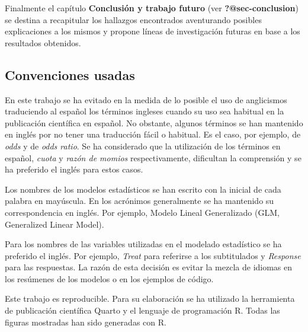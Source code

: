 \documentclass[
  letterpaper,
  DIV=11,
  numbers=noendperiod]{scrartcl}
\begin{document}
Finalmente el capítulo \textbf{Conclusión y trabajo futuro} (ver
\textbf{?@sec-conclusion}) se destina a recapitular los hallazgos
encontrados aventurando posibles explicaciones a los mismos y propone
líneas de investigación futuras en base a los resultados obtenidos.

\hypertarget{convenciones-usadas}{%
\subsection{Convenciones usadas}\label{convenciones-usadas}}

En este trabajo se ha evitado en la medida de lo posible el uso de
anglicismos traduciendo al español los términos ingleses cuando su uso
sea habitual en la publicación científica en español. No obstante,
algunos términos se han mantenido en inglés por no tener una traducción
fácil o habitual. Es el caso, por ejemplo, de \emph{odds} y de
\emph{odds ratio}. Se ha considerado que la utilización de los términos
en español, \emph{cuota} y \emph{razón de momios} respectivamente,
dificultan la comprensión y se ha preferido el inglés para estos casos.

Los nombres de los modelos estadísticos se han escrito con la inicial de
cada palabra en mayúscula. En los acrónimos generalmente se ha mantenido
su correspondencia en inglés. Por ejemplo, Modelo Lineal Generalizado
(GLM, Generalized Linear Model).

Para los nombres de las variables utilizadas en el modelado estadístico
se ha preferido el inglés. Por ejemplo, \emph{Treat} para referirse a
los subtitulados y \emph{Response} para las respuestas. La razón de esta
decisión es evitar la mezcla de idiomas en los resúmenes de los modelos
o en los ejemplos de código.

Este trabajo es reproducible. Para su elaboración se ha utilizado la
herramienta de publicación científica Quarto y el lenguaje de
programación R. Todas las figuras mostradas han sido generadas con R.
\end{document}
